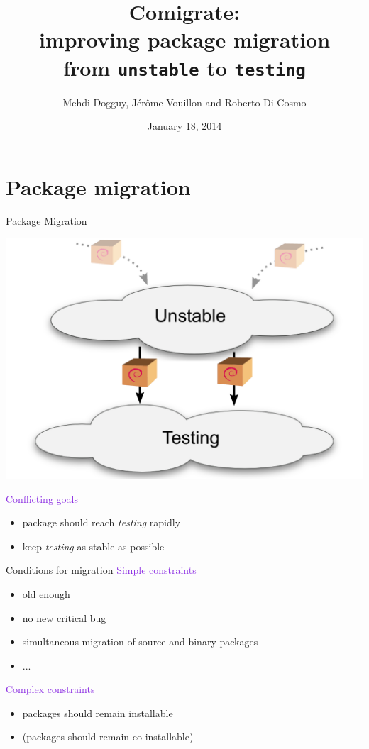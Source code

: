 \documentclass[xcolor={dvipsnames}]{beamer}
\title[Comigrate]%
{Comigrate: \\ improving package migration \\
 from \texttt{unstable} to \texttt{testing}}
\author[Di Cosmo/Dogguy/Vouillon]{Mehdi Dogguy, J\'er\^ome Vouillon and Roberto Di Cosmo}
\date[2014-01-18]{January 18, 2014}
\newcommand{\EEE}[1]{\textcolor{BlueViolet}{#1}}
\begin{document}
\begin{frame}[label=title]{}
 \titlepage
 \vspace{-1.5cm}
 \begin{center}
 \end{center}
\end{frame}

\part{Package migration}
\frame{\partpage}

\begin{frame}{Package Migration}

\begin{center}
\includegraphics[width=0.7\linewidth]{figures/migration}
\end{center}

\vspace{-1em}
\EEE{Conflicting goals}
\begin{itemize}
\item package should reach \textit{testing} rapidly
\item keep \textit{testing} as stable as possible
\end{itemize}

\end{frame}

\begin{frame}{Conditions for migration}
\EEE{Simple constraints} %
\begin{itemize}
\item old enough
\item no new critical bug
\item simultaneous migration of source and binary packages
\item ...
\end{itemize}
\EEE{Complex constraints}
\begin{itemize}
\item packages should remain installable
\item (packages should remain co-installable)
\end{itemize}
\end{frame}
\end{document}
